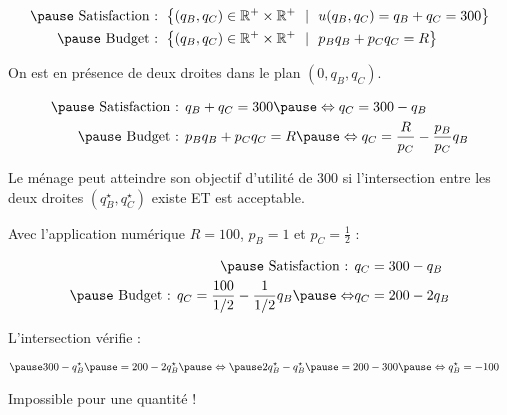 \documentclass[9pt,professionalfonts,handout,hyperref]{beamer}
\begin{document}
\begin{frame}

\[\begin{aligned}
\pause \text{ Satisfaction :   }&\left\{(q_B, q_C) \in \mathbb{R}^{+}\times\mathbb{R}^{+} ~~|~~u(q_B, q_C) = q_B + q_C = 300 \right\} \\
\pause \text{ Budget :   }&\left\{(q_B, q_C) \in \mathbb{R}^{+}\times\mathbb{R}^{+} ~~|~~p_Bq_B + p_Cq_C=R\right\}
\end{aligned}\]

\bigskip

\pause On est en présence de deux droites dans le plan $(0,q_B,q_C)$.

\[\begin{aligned}
\pause \text{ Satisfaction :   }&q_B + q_C = 300 \pause \Leftrightarrow q_C = 300-q_B \\
\pause \text{ Budget :   }&p_Bq_B + p_Cq_C=R \pause \Leftrightarrow q_C = \frac{R}{p_C} -\frac{p_B}{p_C}q_B
\end{aligned}\]

\pause Le ménage peut atteindre son objectif d'utilité de 300 \pause si l'intersection entre les deux droites $(q_B^\star,q_C^\star)$ existe \pause ET est acceptable.

\end{frame}


\begin{frame}


Avec l'application numérique $R =100$, $p_B= 1$ et $p_C = \frac{1}{2}$ :

\[\begin{aligned}
\pause \text{ Satisfaction :   }&q_C = 300-q_B \\
\pause \text{ Budget :   }q_C = \frac{100}{1/2} -\frac{1}{1/2}q_B\pause \Leftrightarrow &q_C = 200-2q_B
\end{aligned}\]

\pause L'intersection vérifie :

\[\begin{aligned}
\pause &300-q_B^\star \pause = 200-2q_B^\star \pause \Leftrightarrow \pause 2q_B^\star-q_B^\star \pause = 200-300 \pause \Leftrightarrow q_B^\star = -100
\end{aligned}\]

\bigskip

\pause Impossible pour une quantité !

\end{frame}
\end{document}
